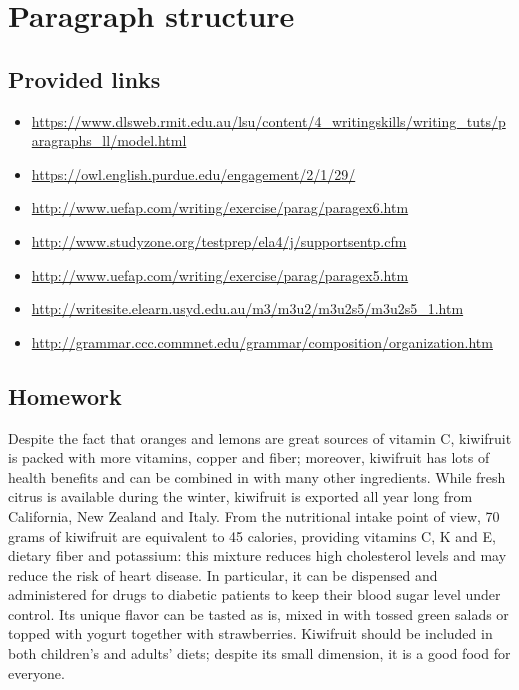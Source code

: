 
\chapter{Paragraph structure}

\section{Provided links}

\begin{itemize}
    \item \url{https://www.dlsweb.rmit.edu.au/lsu/content/4_writingskills/writing_tuts/paragraphs_ll/model.html}
    \item \url{https://owl.english.purdue.edu/engagement/2/1/29/}
    \item \url{http://www.uefap.com/writing/exercise/parag/paragex6.htm}
    \item \url{http://www.studyzone.org/testprep/ela4/j/supportsentp.cfm}
    \item \url{http://www.uefap.com/writing/exercise/parag/paragex5.htm}
    \item \url{http://writesite.elearn.usyd.edu.au/m3/m3u2/m3u2s5/m3u2s5_1.htm}
    \item \url{http://grammar.ccc.commnet.edu/grammar/composition/organization.htm}
\end{itemize}

\section{Homework}

Despite the fact that oranges and lemons are great sources of vitamin C,
kiwifruit is packed with more vitamins, copper and fiber;
moreover, kiwifruit has lots of health benefits and can be combined in with
many other ingredients. While fresh citrus is available during
the winter, kiwifruit is exported all year long from California, New Zealand and
Italy. From the nutritional intake point of view,
70 grams of kiwifruit are equivalent to 45 calories,
providing vitamins C, K and E, dietary fiber and potassium: this
mixture reduces high cholesterol levels and may reduce the risk of
heart disease. In particular, it can be dispensed and administered
for drugs to diabetic
patients to keep their blood sugar level under control. Its
unique flavor can be tasted as is, mixed in with tossed green salads
or topped with yogurt together with strawberries.  Kiwifruit
should be included in both children's and adults' diets;
despite its small dimension, it is a good food for everyone.
